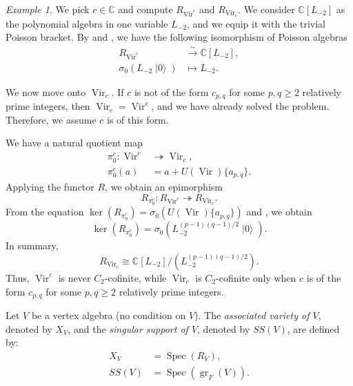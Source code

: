 \documentclass[a4paper, 12pt, reqno]{amsart}
\theoremstyle{remark}
\newtheorem{example}[theorem]{Example}
\DeclareMathOperator{\Vir}{Vir}
\DeclareMathOperator{\gr}{gr}
\DeclareMathOperator{\vac}{|0\rangle}
\DeclareMathOperator{\Spec}{Spec}
\begin{document}
\begin{example}
  \label{exa:16}
  We pick $c \in \mathbb{C}$ and compute $R_{\Vir^c}$ and $R_{\Vir_c}$.
  We consider $\mathbb{C}[L_{-2}]$ as the polynomial algebra in one variable $L_{-2}$, and we equip it with the trivial Poisson bracket.
  By  and , we have the following isomorphism of Poisson algebras
  \begin{align*}
    R_{\Vir^c} &\xrightarrow{\sim} \mathbb{C}[L_{-2}], \\
    \sigma_0(L_{-2}\vac) &\mapsto L_{-2}.
  \end{align*}

  We now move onto $\Vir_c$.
  If $c$ is not of the form $c_{p, q}$ for some $p, q \ge 2$ relatively prime integers, then $\Vir_c = \Vir^c$, and we have already solved the problem.
  Therefore, we assume $c$ is of this form.

  We have a natural quotient map
  \begin{align*}
    \pi^c_0: \Vir^c &\twoheadrightarrow \Vir_c, \\
    \pi^c_0(a) &= a + U(\Vir)\{a_{p, q}\}.
  \end{align*}
  Applying the functor $R$, we obtain an epimorphism
  \begin{equation*}
    R_{\pi^c_0}: R_{\Vir^c} \twoheadrightarrow R_{\Vir_c}.
  \end{equation*}
  From the equation $\ker(R_{\pi^c_0}) = \sigma_0(U(\Vir)\{a_{p, q}\})$ and , we obtain
  \begin{equation*}
    \ker(R_{\pi^c_0}) = \sigma_0(L_{-2}^{(p - 1)(q - 1)/2}\vac).
  \end{equation*}
  In summary,
  \begin{equation*}
    R_{\Vir_c} \cong \mathbb{C}[L_{-2}]/(L_{-2}^{(p - 1)(q - 1)/2}).
  \end{equation*}
  Thus, $\Vir^c$ is never $C_2$-cofinite, while $\Vir_c$ is $C_2$-cofinite only when $c$ is of the form $c_{p, q}$ for some $p, q \ge 2$ relatively prime integers.
\end{example}

Let $V$ be a vertex algebra (no condition on $V$).
The \emph{associated variety of $V$}, denoted by $X_V$, and the \emph{singular support of $V$}, denoted by $SS(V)$, are defined by:
\begin{align*}
  X_V &= \Spec(R_V), \\
  SS(V) &= \Spec(\gr_F(V)).
\end{align*}
\end{document}
